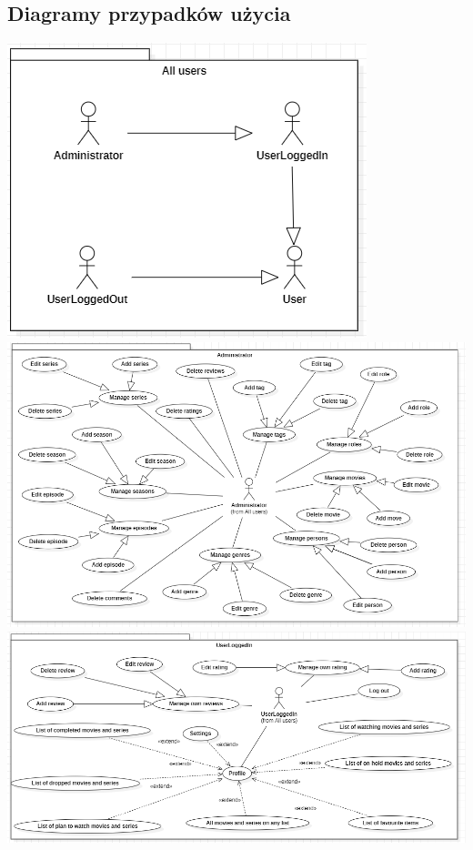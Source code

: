 \documentclass[12pt]{article}
\begin{document}
\begin{flushleft}
		\subsection{Diagramy przypadków użycia}
			\includegraphics[scale=0.9]{UseCase_AllUsers.png} \linebreak
			\includegraphics[scale=0.7]{UseCase_Administrator.png} \linebreak
			\includegraphics[scale=0.7]{UseCase_UserLoggedIn.png} \linebreak

\end{flushleft}
\end{document}
